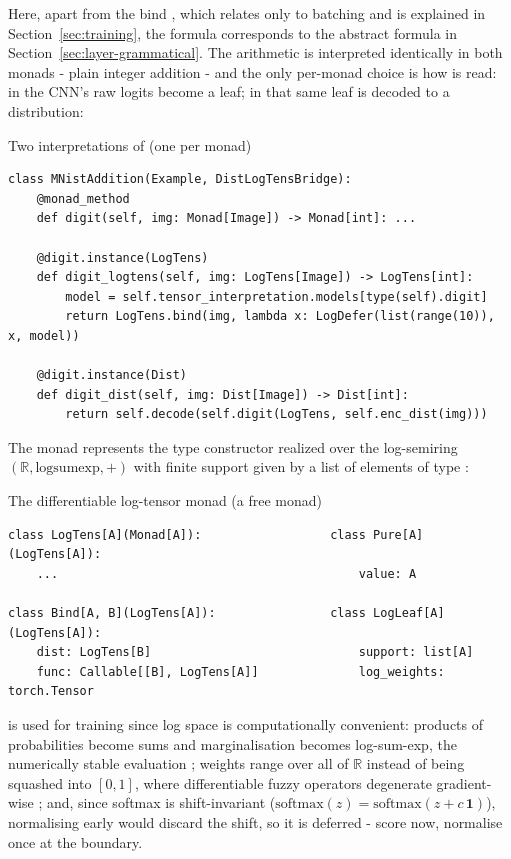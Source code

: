 \documentclass[anon]{../../journal-templates/NeSy26/nesy2026} %
\begin{document}
\noindent
Here, apart from the bind , which relates only to batching and is explained in Section~\ref{sec:training}, the formula corresponds to the abstract formula in Section~\ref{sec:layer-grammatical}.
The arithmetic is interpreted identically in both monads - plain integer addition - and the only
per-monad choice is how  is read: in  the CNN's raw logits become a
leaf; in  that same leaf is decoded to a distribution:

\begin{impl}{Two interpretations of  (one per monad)}{}
  \small
  \begin{verbatim}
class MNistAddition(Example, DistLogTensBridge):
    @monad_method
    def digit(self, img: Monad[Image]) -> Monad[int]: ...

    @digit.instance(LogTens)
    def digit_logtens(self, img: LogTens[Image]) -> LogTens[int]:
        model = self.tensor_interpretation.models[type(self).digit]
        return LogTens.bind(img, lambda x: LogDefer(list(range(10)), x, model))

    @digit.instance(Dist)
    def digit_dist(self, img: Dist[Image]) -> Dist[int]:
        return self.decode(self.digit(LogTens, self.enc_dist(img)))
  \end{verbatim}
\end{impl}

\noindent
The  monad represents the type constructor 
realized over the log-semiring $(\mathbb R,\mathrm{logsumexp},+)$ with finite support given by a list \minth{[a]} of elements of type :

\begin{impl}{The differentiable log-tensor monad (a free monad)}{}
  \small
  \begin{verbatim}
class LogTens[A](Monad[A]):                  class Pure[A](LogTens[A]):
    ...                                          value: A

class Bind[A, B](LogTens[A]):                class LogLeaf[A](LogTens[A]):
    dist: LogTens[B]                             support: list[A]
    func: Callable[[B], LogTens[A]]              log_weights: torch.Tensor
  \end{verbatim}
\end{impl}

\noindent
{} is used for training since log space is computationally convenient: products of probabilities become sums and marginalisation becomes
log-sum-exp, the numerically stable evaluation \citep{blanchard2021accurately}; weights
range over all of $\mathbb R$ instead of being squashed into $[0,1]$, where
differentiable fuzzy operators degenerate gradient-wise
\citep{kriekenDifferentiableFuzzyOps2022}; and, since softmax is shift-invariant
($\mathrm{softmax}(z) = \mathrm{softmax}(z + c\,\mathbf 1)$), normalising early would
discard the shift, so it is deferred - score now, normalise once at the boundary.
\end{document}

